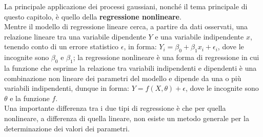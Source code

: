 \begin{oss}
La principale applicazione dei processi gaussiani, nonché il tema principale di questo capitolo, è quello della \textbf{regressione nonlineare}.\\
Mentre il modello di regressione lineare cerca, a partire da dati osservati, una relazione lineare tra una variabile dipendente $Y$ e una variabile indipendente $x$, tenendo conto di un errore statistico $\epsilon$, in forma: $Y_i=\beta_0+\beta_1 x_i+\epsilon_i$, dove le incognite sono $\beta_0$ e $\beta_1$; la regressione nonlineare è una forma di regressione in cui la funzione che esprime la relazione tra variabili indipendenti e dipendenti è una combinazione non lineare dei parametri del modello e dipende da una o più variabili indipendenti, dunque in forma: $Y=f(X,\theta)+\epsilon$, dove le incognite sono $\theta$ e la funzione $f$.\\
Una importante differenza tra i due tipi di regressione è che per quella nonlineare, a differenza di quella lineare, non esiste un metodo generale per la determinazione dei valori dei parametri. 


\end{oss}
